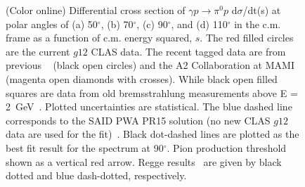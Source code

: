 \documentclass[aps,prc,twocolumn,floatfix,showpacs,preprintnumbers,amsmath,amssymb,superscriptaddress,linenumbers]{revtex4-1}
\begin{document}
\begin{figure}[htb!]
        \caption {(Color online) Differential cross section of 
	$\gamma p\rightarrow\pi^0p$ d$\sigma$/dt(s) at polar angles 
	of (a) 50$^\circ$, (b) 70$^\circ$, 
	(c) 90$^\circ$, and (d) 
	110$^\circ$ in the c.m. frame as a function of c.m. energy 
	squared, $s$. The red filled circles are the current $g12$ 
	CLAS data. The recent tagged data are from previous 
	{\color{red}{CLAS Collaboration 
	measurements}}~\protect\cite{Dugger:2007bt} (black open 
	circles) and the A2 Collaboration at 
	MAMI~\protect\cite{Adlarson:2015byy} 
	(magenta open diamonds with crosses). While black open filled 
	squares are data from old bremsstrahlung measurements above 
	E = 2~GeV~\protect\cite{brem}. Plotted uncertainties are 
	statistical.  
	The blue dashed line corresponds to the SAID PWA 
	PR15 solution (no new CLAS $g12$ data are used 
	for the fit)~\protect\cite{Adlarson:2015byy}.  Black dot-dashed 
	lines are plotted as the best fit result for the spectrum at 
	90$^\circ$. Pion production threshold shown as a vertical 
	red arrow. Regge results~\protect\cite{Goldstein:1973xn,
	Laget:2005be} are given by black dotted and blue dash-dotted, 
	respectively.} \label{fig:scaling}
\end{figure}
\end{document}
